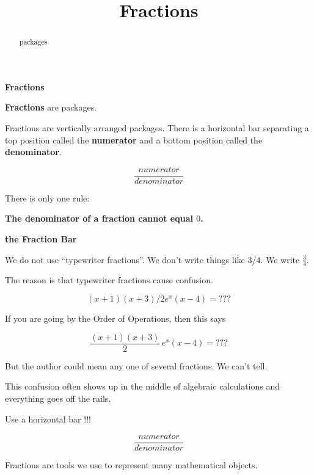 \documentclass{ximera}
\title{Fractions}
\begin{document}
\begin{abstract}
packages
\end{abstract}
\maketitle



\begin{definition}  \textbf{\textcolor{green!50!black}{Fractions}} 


\textbf{Fractions} are packages. 


Fractions are vertically arranged packages.  There is a horizontal bar separating a top position called the \textbf{numerator} and a bottom position called the \textbf{denominator}.



\[
\frac{numerator}{denominator}
\]


There is only one rule:

\begin{center}
\textbf{\textcolor{red!70!black}{The denominator of a fraction cannot equal $0$.}}
\end{center}


\end{definition}




\begin{warning} \textbf{\textcolor{red!70!black}{the Fraction Bar}}

We do not use ``typewriter fractions''.  We don't write things like 3/4.  We write $\frac{3}{4}$.


The reason is that typewriter fractions cause confusion.

\[
(x+1)(x+3)/2 e^x (x-4) = ???
\]


If you are going by the Order of Operations, then this says


\[
\frac{(x+1)(x+3)}{2} \, e^x (x-4) = ???
\]


But the author could mean any one of several fractions.  We can't tell.


This confusion often shows up in the middle of algebraic calculations and everything goes off the rails.

Use a horizontal bar !!!


\[
\frac{numerator}{denominator}
\]


\end{warning}


Fractions are tools we use to represent many mathematical objects.
\end{document}
